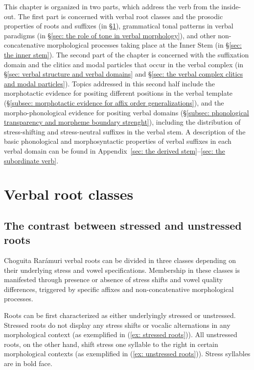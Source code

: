 This chapter is organized in two parts, which address the verb from the inside-out. The first part is concerned with verbal root classes and the prosodic properties of roots and suffixes (in §\ref{sec: verbal root classes in shifting and neutral constructions}), grammatical tonal patterns in verbal paradigms (in §\ref{sec: the role of tone in verbal morphology}), and other non-concatenative morphological processes taking place at the Inner Stem (in §\ref{sec: the inner stem}). The second part of the chapter is concerned with the suffixation domain and the clitics and modal particles that occur in the verbal complex (in §\ref{sec: verbal structure and verbal domains} and §\ref{sec: the verbal complex clitics and modal particles}). Topics addressed in this second half include the morphotactic evidence for positing different positions in the verbal template (§\ref{subsec: morphotactic evidence for affix order generalizations}), and the morpho-phonological evidence for positing verbal domains (§\ref{subsec: phonological transparency and morpheme boundary strenght}), including the distribution of stress-shifting and stress-neutral suffixes in the verbal stem. A description of the basic phonological and morphosyntactic properties of verbal suffixes in each verbal domain can be found in Appendix~\ref{sec: the derived stem}--\ref{sec: the subordinate verb}.

\section{Verbal root classes}
\label{sec: verbal root classes in shifting and neutral constructions}

\subsection{The contrast between stressed and unstressed roots}
\label{subsec: contrast between stressed and unstressed roots}

Choguita Rarámuri verbal roots can be divided in three classes depending on their underlying stress and vowel specifications. Membership in these classes is manifested through presence or absence of stress shifts and vowel quality differences, triggered by specific affixes and non-concatenative morphological processes.

Roots can be first characterized as either underlyingly stressed or unstressed. Stressed roots do not display any stress shifts or vocalic alternations in any morphological context (as exemplified in (\ref{ex: stressed roots})). All unstressed roots, on the other hand, shift stress one syllable to the right in certain morphological contexts (as exemplified in (\ref{ex: unstressed roots})). Stress syllables are in bold face.

